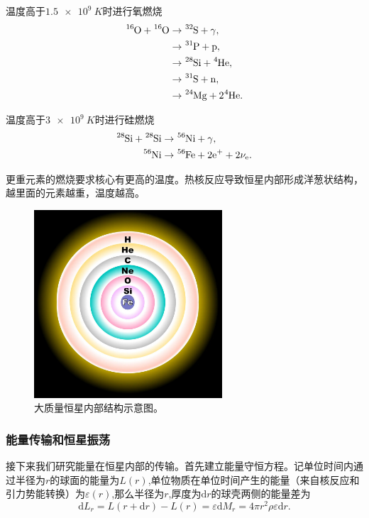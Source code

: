\documentclass[../天体物理基础.tex]{subfiles}
\begin{document}
温度高于$\qty{1.5e9}{K}$时进行氧燃烧
\begin{align}
\ce{^{16}O}+\ce{^{16}O}&\to\ce{^{32}S}+\gamma,\notag\\
&\to\ce{^{31}P}+\ce{p},\notag\\
&\to\ce{^{28}Si}+\ce{^{4}He},\notag\\
&\to\ce{^{31}S}+\ce{n},\notag\\
&\to\ce{^{24}Mg}+2\ce{^{4}He}.\notag
\end{align}

温度高于$\qty{3e9}{K}$时进行硅燃烧
\begin{align}
\ce{^{28}Si}+\ce{^{28}Si}&\to\ce{^{56}Ni}+\gamma,\notag\\
\ce{^{56}Ni}&\to\ce{^{56}Fe}+2\ce{e+}+2\nu_{\ce{e}}.\notag
\end{align}

更重元素的燃烧要求核心有更高的温度。热核反应导致恒星内部形成洋葱状结构，越里面的元素越重，温度越高。
\begin{figure}[!htbp]
\centering
\includegraphics[width=7cm]{figures/figure2_2.JPG}
\captionsetup{justification=raggedright, singlelinecheck=false}
\caption{大质量恒星内部结构示意图。}
\label{大质量恒星内部结构示意图。}
\end{figure}

\subsubsection{能量传输和恒星振荡}
接下来我们研究能量在恒星内部的传输。首先建立能量守恒方程。记单位时间内通过半径为$r$的球面的能量为$L\left(r\right)$,单位物质在单位时间产生的能量（来自核反应和引力势能转换）为$\varepsilon\left(r\right)$,那么半径为$r$,厚度为$\mathrm{d}r$的球壳两侧的能量差为
\begin{equation}
\mathrm{d}L_{r}=L\left(r+\mathrm{d}r\right)-L\left(r\right)=\varepsilon\mathrm{d}M_{r}=4\pi{}r^{2}\rho\varepsilon\mathrm{d}r.
\end{equation}
\end{document}
